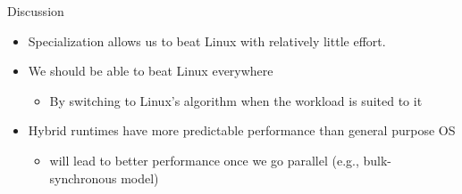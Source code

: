 \begin{block}{Discussion}

  \begin{itemize}

  \item Specialization allows us to beat Linux with relatively little effort.

  \item We should be able to beat Linux everywhere
    \begin{itemize}
    \item By switching to Linux's algorithm when the workload is suited to it
    \end{itemize}
    

  \item Hybrid runtimes have more predictable performance than general purpose OS
    \begin{itemize}
    \item will lead to better performance once we go parallel (e.g., bulk-synchronous model)
    \end{itemize}

  \end{itemize}
\end{block}
